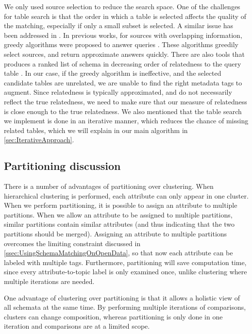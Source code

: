 We only used source selection to reduce the search space. One of the challenges for table search is that the order in which a table is selected affects the quality of the matching, especially if only a small subset is selected. A similar issue has been addressed in \cite{Dong2012Proceedings}. In previous works, for sources with overlapping information, greedy algorithms were proposed to answer queries \cite{10.1145/1951365.1951414}. These algorithms greedily select sources, and return approximate answers quickly. There are also tools that produces a ranked list of schema in decreasing order of relatedness to the query table \cite{DBLP:conf/sigmod/ChenMH09}. In our case, if the greedy algorithm is ineffective, and the selected candidate tables are unrelated, we are unable to find the right metadata tags to augment. Since relatedness is typically approximated, and do not necessarily reflect the true relatedness, we need to make sure that our measure of relatedness is close enough to the true relatedness. We also mentioned that the table search we implement is done in an iterative manner, which reduces the chance of missing related tables, which we will explain in our main algorithm in \autoref{sec:IterativeApproach}.

\subsection{Partitioning discussion}
\label{ssec:PartitioningDiscussion}

There is a number of advantages of partitioning over clustering. When hierarchical clustering is performed, each attribute can only appear in one cluster. When we perform partitioning, it is possible to assign an attribute to multiple partitions. When we allow an attribute to be assigned to multiple partitions, similar partitions contain similar attributes (and thus indicating that the two partitions should be merged). Assigning an attribute to multiple partitions overcomes the limiting constraint discussed in \autoref{ssec:UsingSchemaMatchingOnOpenData}, so that now each attribute can be labeled with multiple tags. Furthermore, partitioning will save computation time, since every attribute-to-topic label is only examined once, unlike clustering where multiple iterations are needed.

One advantage of clustering over partitioning is that it allows a holistic view of all schemata at the same time. By performing multiple iterations of comparisons, clusters can change composition, whereas partitioning is only done in one iteration and comparisons are at a limited scope.

